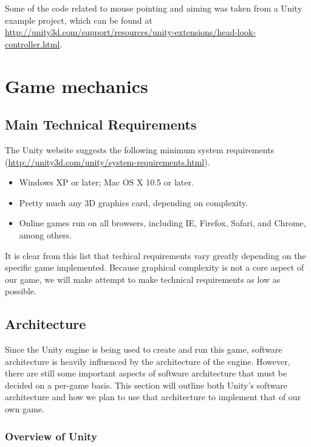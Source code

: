 \documentclass{article}
\begin{document}
Some of the code related to mouse pointing and aiming was taken from a Unity example project, which can be found at \url{http://unity3d.com/support/resources/unity-extensions/head-look-controller.html}.

\section{Game mechanics}

\subsection{Main Technical Requirements}

The Unity website suggests the following minimum system requirements (\url{http://unity3d.com/unity/system-requirements.html}).

\begin{itemize}

\item {Windows XP or later; Mac OS X 10.5 or later.}
\item{Pretty much any 3D graphics card, depending on complexity.}
\item{Online games run on all browsers, including IE, Firefox, Safari, and Chrome, among others.}

\end{itemize}

It is clear from this list that techical requirements vary greatly depending on the specific game implemented.  Because graphical complexity is not a core aspect of our game, we will make attempt to make technical requirements as low as possible.

\label{Architecture}
\subsection{Architecture}

Since the Unity engine is being used to create and run this game, software architecture is heavily influenced by the architecture of the engine.  However, there are still some important aspects of software architecture that must be decided on a per-game basis.  This section will outline both Unity's software architecture and how we plan to use that architecture to implement that of our own game.

\subsubsection{Overview of Unity}
\end{document}
